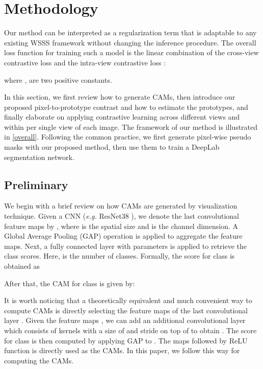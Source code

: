 \documentclass[10pt,twocolumn,letterpaper]{article}
\begin{document}
\section{Methodology}
Our method can be interpreted as a regularization term that is adaptable to any existing WSSS framework without changing the inference procedure.
The overall loss function for training such a model is the linear combination of the cross-view contrastive loss  and the intra-view contrastive loss :

where ,  are two positive constants.

In this section, we first review how to generate CAMs, then introduce our proposed pixel-to-prototype contrast and how to estimate the prototypes, and finally elaborate on applying contrastive learning across different views and within per single view of each image.
The framework of our method is illustrated in \cref{overall}. 
Following the common practice, we first generate pixel-wise pseudo masks with our proposed method, then use them to train a DeepLab \cite{chen2014semantic_Deeplabv1, chen2017deeplabV2} segmentation network. 


\subsection{Preliminary}
We begin with a brief review on how CAMs are generated by visualization technique.
Given a CNN (\textit{e.g.} ResNet38 \cite{Resnet38}), we denote the last convolutional feature maps by , where  is the spatial size and  is the channel dimension.
A Global Average Pooling (GAP) operation is applied to aggregate the feature maps. Next, a fully connected layer with parameters  is applied to retrieve the class scores. Here,  is the number of classes. Formally, the score for class  is obtained as


After that, the CAM  for class  is given by:


It is worth noticing that a theoretically equivalent and much convenient way to compute CAMs is directly selecting the feature maps of the last convolutional layer \cite{zhang2018adversarialCAMfirst}. Given the feature maps , we can add an additional convolutional layer which consists of  kernels with a size of  and stride  on top of  to obtain . The score for class  is then computed by applying GAP to . The maps  followed by ReLU function is directly used as the CAMs. 
In this paper, we follow this way for computing the CAMs.
\end{document}
